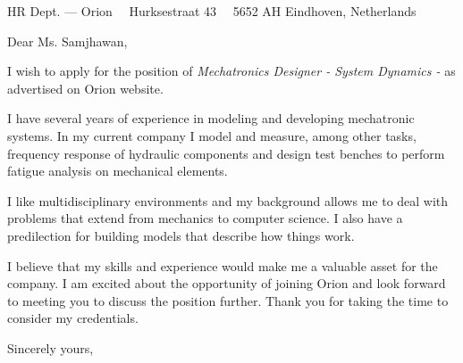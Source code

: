 \documentclass{scrlttr2}
\renewcommand{\\}{\ {\large\textperiodcentered}\ }
\begin{document}

\begin{letter}{ %
HR Dept. --- Orion\\
Hurksestraat 43\\
5652 AH Eindhoven, Netherlands
}


\opening{Dear Ms. Samjhawan,}

I wish to apply for the position of \emph{Mechatronics Designer - System Dynamics - } as advertised on Orion website.\\

I have several years of experience in modeling and developing mechatronic systems. In my current company I model and measure, among other tasks, frequency response of hydraulic components and design test benches to perform fatigue analysis on mechanical elements.  

I like multidisciplinary environments and my background allows me to deal with problems that extend from mechanics to computer science. I also have a predilection for building models that describe how things work.\\

I believe that my skills and experience would make me a valuable asset for the company. 
I am excited about the opportunity of joining Orion and look forward to meeting you to discuss the position further. Thank you for taking the time to consider my credentials.\\


Sincerely yours, \\ \\


\end{letter}
\end{document}
